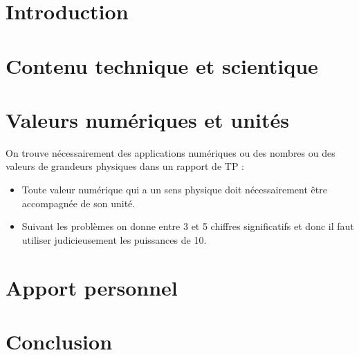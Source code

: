 
\section{Introduction}

\section{Contenu technique et scientique}

\section{Valeurs numériques et unités}



On trouve nécessairement des applications numériques ou des nombres ou des valeurs de grandeurs physiques dans un rapport de TP :

\begin{itemize}
\item Toute valeur numérique qui a un sens physique doit  nécessairement être
 accompagnée de son unité.
\item Suivant les problèmes on donne entre 3 et 5 chiffres significatifs et donc il faut utiliser judicieusement les puissances de 10.
\end{itemize} 

\section{Apport personnel}


\section{Conclusion}